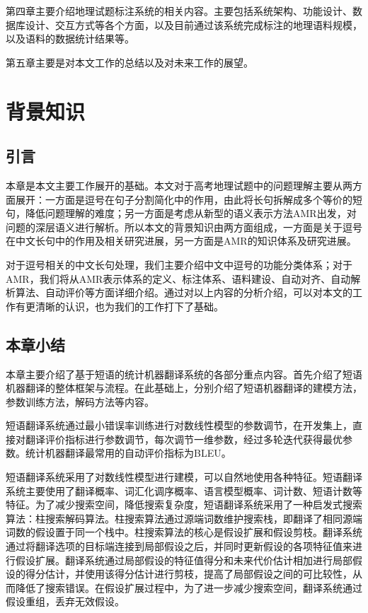 \documentclass[master, winfont]{njuthesis}
\begin{document}
第四章主要介绍地理试题标注系统的相关内容。主要包括系统架构、功能设计、数据库设计、交互方式等各个方面，以及目前通过该系统完成标注的地理语料规模，以及语料的数据统计结果等。

第五章主要是对本文工作的总结以及对未来工作的展望。

\chapter{背景知识}
\section{引言}


本章是本文主要工作展开的基础。本文对于高考地理试题中的问题理解主要从两方面展开：一方面是逗号在句子分割简化中的作用，由此将长句拆解成多个等价的短句，降低问题理解的难度；另一方面是考虑从新型的语义表示方法AMR出发，对问题的深层语义进行解析。所以本文的背景知识由两方面组成，一方面是关于逗号在中文长句中的作用及相关研究进展，另一方面是AMR的知识体系及研究进展。

对于逗号相关的中文长句处理，我们主要介绍中文中逗号的功能分类体系；对于AMR，我们将从AMR表示体系的定义、标注体系、语料建设、自动对齐、自动解析算法、自动评价等方面详细介绍。通过对以上内容的分析介绍，可以对本文的工作有更清晰的认识，也为我们的工作打下了基础。


\section{本章小结}
本章主要介绍了基于短语的统计机器翻译系统的各部分重点内容。首先介绍了短语机器翻译的整体框架与流程。在此基础上，分别介绍了短语机器翻译的建模方法，参数训练方法，解码方法等内容。

短语翻译系统通过最小错误率训练进行对数线性模型的参数调节，在开发集上，直接对翻译评价指标进行参数调节，每次调节一维参数，经过多轮迭代获得最优参数。统计机器翻译最常用的自动评价指标为BLEU。

短语翻译系统采用了对数线性模型进行建模，可以自然地使用各种特征。短语翻译系统主要使用了翻译概率、词汇化调序概率、语言模型概率、词计数、短语计数等特征。为了减少搜索空间，降低搜索复杂度，短语翻译系统采用了一种启发式搜索算法：柱搜索解码算法。柱搜索算法通过源端词数维护搜索栈，即翻译了相同源端词数的假设置于同一个栈中。柱搜索算法的核心是假设扩展和假设剪枝。翻译系统通过将翻译选项的目标端连接到局部假设之后，并同时更新假设的各项特征值来进行假设扩展。翻译系统通过局部假设的特征值得分和未来代价估计相加进行局部假设的得分估计，并使用该得分估计进行剪枝，提高了局部假设之间的可比较性，从而降低了搜索错误。在假设扩展过程中，为了进一步减少搜索空间，翻译系统通过假设重组，丢弃无效假设。
\end{document}
